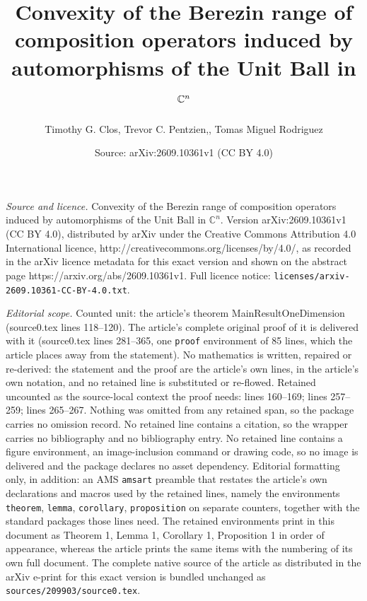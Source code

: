 \documentclass[10pt,a4paper]{amsart}
\title{Convexity of the Berezin range of composition operators induced by automorphisms of the Unit Ball in $\C^{n}$}
\author{Timothy G. Clos, Trevor C. Pentzien,, Tomas Miguel Rodriguez}
\date{Source: arXiv:2609.10361v1 (CC BY 4.0)}
\newcommand{\C}{\mathbb{C}}
\begin{document}
\maketitle

\noindent\emph{Source and licence.} Convexity of the Berezin range of composition operators induced by automorphisms of the Unit Ball in $\C^{n}$. Version arXiv:2609.10361v1 (CC BY 4.0), distributed by arXiv under the Creative Commons Attribution 4.0 International licence, http://creativecommons.org/licenses/by/4.0/, as recorded in the arXiv licence metadata for this exact version and shown on the abstract page https://arxiv.org/abs/2609.10361v1. Full licence notice: \texttt{licenses/arxiv-2609.10361-CC-BY-4.0.txt}.\par\smallskip

\noindent\textit{Editorial scope.} Counted unit: the article's theorem MainResultOneDimension (source0.tex lines 118--120). The article's complete original proof of it is delivered with it (source0.tex lines 281--365, one \texttt{proof} environment of 85 lines, which the article places away from the statement). No mathematics is written, repaired or re-derived: the statement and the proof are the article's own lines, in the article's own notation, and no retained line is substituted or re-flowed.  Retained uncounted as the source-local context the proof needs: lines 160--169; lines 257--259; lines 265--267.  Nothing was omitted from any retained span, so the package carries no omission record.  No retained line contains a citation, so the wrapper carries no bibliography and no bibliography entry.  No retained line contains a figure environment, an image-inclusion command or drawing code, so no image is delivered and the package declares no asset dependency.  Editorial formatting only, in addition: an AMS \texttt{amsart} preamble that restates the article's own declarations and macros used by the retained lines, namely the environments \texttt{theorem}, \texttt{lemma}, \texttt{corollary}, \texttt{proposition} on separate counters, together with the standard packages those lines need.  The retained environments print in this document as Theorem 1, Lemma 1, Corollary 1, Proposition 1 in order of appearance, whereas the article prints the same items with the numbering of its own full document.  The complete native source of the article as distributed in the arXiv e-print for this exact version is bundled unchanged as \texttt{sources/209903/source0.tex}.
\end{document}
